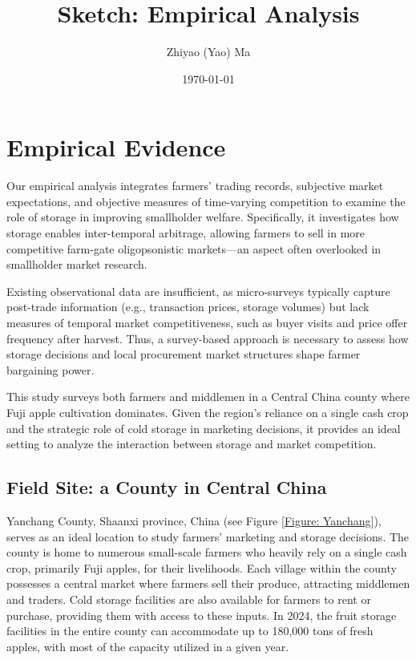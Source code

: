 \documentclass[12pt]{article}
\title{Sketch: Empirical Analysis}
\author{Zhiyao (Yao) Ma}
\date{\today}
\begin{document}
\maketitle

\section{Empirical Evidence}

\noindent Our empirical analysis integrates farmers' trading records, subjective market expectations, and objective measures of time-varying competition to examine the role of storage in improving smallholder welfare. Specifically, it investigates how storage enables inter-temporal arbitrage, allowing farmers to sell in more competitive farm-gate oligopsonistic markets—an aspect often overlooked in smallholder market research.

Existing observational data are insufficient, as micro-surveys typically capture post-trade information (e.g., transaction prices, storage volumes) but lack measures of temporal market competitiveness, such as buyer visits and price offer frequency after harvest. Thus, a survey-based approach is necessary to assess how storage decisions and local procurement market structures shape farmer bargaining power.

This study surveys both farmers and middlemen in a Central China county where Fuji apple cultivation dominates. Given the region's reliance on a single cash crop and the strategic role of cold storage in marketing decisions, it provides an ideal setting to analyze the interaction between storage and market competition.


\subsection{Field Site: a County in Central China}
\noindent Yanchang County, Shaanxi province, China (see Figure \ref{Figure: Yanchang}), serves as an ideal location to study farmers' marketing and storage decisions. The county is home to numerous small-scale farmers who heavily rely on a single cash crop, primarily Fuji apples, for their livelihoods. Each village within the county possesses a central market where farmers sell their produce, attracting middlemen and traders. Cold storage facilities are also available for farmers to rent or purchase, providing them with access to these inputs. In 2024, the fruit storage facilities in the entire county can accommodate up to 180,000 tons of fresh apples, with most of the capacity utilized in a given year.
\end{document}
